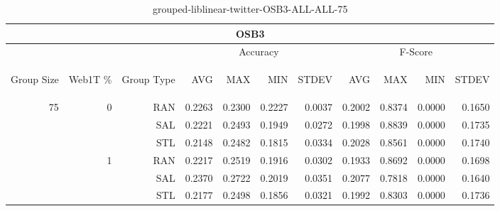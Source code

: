 \begin{center}
\begin{table}[htbp]
\begin{tabular}{ | r | r | r | r | r | r | r | r | r | r | r |}
\hline
\multicolumn{11}{|c|}{OSB3}\\
\hline
 & & & \multicolumn{4}{|c|}{Accuracy} & \multicolumn{4}{|c|}{F-Score}\\ \cline{4-11}
\begin{sideways}Group Size\end{sideways} & \begin{sideways}Web1T \%\end{sideways} & \begin{sideways}Group Type\end{sideways} & \begin{sideways}AVG\end{sideways} & \begin{sideways}MAX\end{sideways} & \begin{sideways}MIN\end{sideways} & \begin{sideways}STDEV\end{sideways} & \begin{sideways}AVG\end{sideways} & \begin{sideways}MAX\end{sideways} & \begin{sideways}MIN\end{sideways} & \begin{sideways}STDEV\end{sideways}\\
\hline
\multirow{6}{*}{75}
 & \multirow{3}{*}{0} & RAN & 0.2263 & 0.2300 & 0.2227 & 0.0037 & 0.2002 & 0.8374 & 0.0000 & 0.1650\\ \cline{3-11}
 &   & SAL & 0.2221 & 0.2493 & 0.1949 & 0.0272 & 0.1998 & 0.8839 & 0.0000 & 0.1735\\ \cline{3-11}
 &   & STL & 0.2148 & 0.2482 & 0.1815 & 0.0334 & 0.2028 & 0.8561 & 0.0000 & 0.1740\\ \cline{2-11}
 & \multirow{3}{*}{1} & RAN & 0.2217 & 0.2519 & 0.1916 & 0.0302 & 0.1933 & 0.8692 & 0.0000 & 0.1698\\ \cline{3-11}
 &   & SAL & 0.2370 & 0.2722 & 0.2019 & 0.0351 & 0.2077 & 0.7818 & 0.0000 & 0.1640\\ \cline{3-11}
 &   & STL & 0.2177 & 0.2498 & 0.1856 & 0.0321 & 0.1992 & 0.8303 & 0.0000 & 0.1736\\ \cline{2-11}
\hline
\end{tabular}
\caption{grouped-liblinear-twitter-OSB3-ALL-ALL-75}
\end{table}
\end{center}

